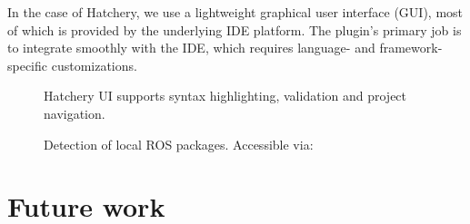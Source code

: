 \documentclass[12pt,initial,twoside,maitrise]{dms}
\numberwithin{equation}{section}
\numberwithin{table}{chapter}
\numberwithin{figure}{chapter}
\begin{document}
In the case of Hatchery, we use a lightweight graphical user interface (GUI), most of which is provided by the underlying IDE platform. The plugin's primary job is to integrate smoothly with the IDE, which requires language- and framework-specific customizations.

\begin{figure}[b]
    \centering
    \caption{Hatchery UI supports syntax highlighting, validation and project navigation.}
    \label{fig:hatchery_gui}
\end{figure}

\begin{figure}
    \centering
    \caption{Detection of local ROS packages. Accessible via: }
    \label{fig:ros_settings}
\end{figure}

\section{Future work}
\end{document}
